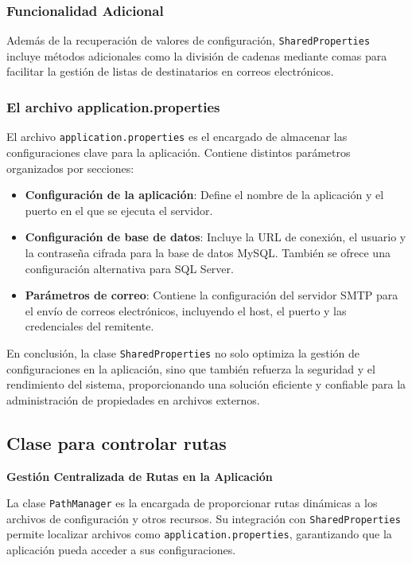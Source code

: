 \documentclass[draft]{scrbook}
\begin{document}
\subsubsection{Funcionalidad Adicional}
Además de la recuperación de valores de configuración, \texttt{SharedProperties} incluye métodos adicionales como la división de cadenas mediante comas para facilitar la gestión de listas de destinatarios en correos electrónicos.

\subsubsection{El archivo application.properties}
El archivo \texttt{application.properties} es el encargado de almacenar las configuraciones clave para la aplicación. Contiene distintos parámetros organizados por secciones:
\begin{itemize}
    \item \textbf{Configuración de la aplicación}: Define el nombre de la aplicación y el puerto en el que se ejecuta el servidor.
    \item \textbf{Configuración de base de datos}: Incluye la URL de conexión, el usuario y la contraseña cifrada para la base de datos MySQL. También se ofrece una configuración alternativa para SQL Server.
    \item \textbf{Parámetros de correo}: Contiene la configuración del servidor SMTP para el envío de correos electrónicos, incluyendo el host, el puerto y las credenciales del remitente.
\end{itemize}

En conclusión, la clase \texttt{SharedProperties} no solo optimiza la gestión de configuraciones en la aplicación, sino que también refuerza la seguridad y el rendimiento del sistema, proporcionando una solución eficiente y confiable para la administración de propiedades en archivos externos.


\subsection{Clase para controlar rutas }
\label{subsec:path-manager}

\textbf{Gestión Centralizada de Rutas en la Aplicación}

La clase \texttt{PathManager} es la encargada de proporcionar rutas dinámicas a los archivos de configuración y otros recursos. Su integración con \texttt{SharedProperties} permite localizar archivos como \texttt{application.properties}, garantizando que la aplicación pueda acceder a sus configuraciones.
\end{document}
